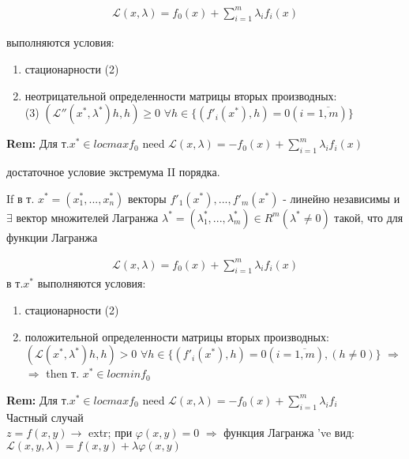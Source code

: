 \begin{equation*}
\begin{aligned}
\mathcal{L}(x,\lambda)=f_0(x) + \sum_{i=1}^{m}\lambda_i f_i(x)
\end{aligned}
\end{equation*}

выполняются условия:
\begin{enumerate}
\item стационарности (2)
\item неотрицательной определенности матрицы вторых производных: \\ 
(3) $(\mathcal{L}''(x^*,\lambda^*)h,h) \geq 0$ $\forall h \in \{ (f'_i(x^*),h) = 0 (i = \overline{1,m})\}$
\end{enumerate}
\textbf{Rem:} Для т.$x^* \in locmax f_0$ need $\mathcal{L}(x,\lambda)=-f_0(x) + \sum _{i=1}^{m} \lambda_i f_i(x)$ \\



\begin{theorem}
достаточное условие экстремума II порядка.
\end{theorem}
\noindent
If в т. $x^* = (x_1^*,...,x_n^*)$ векторы $f'_1(x^*),...,f'_m(x^*)$ - линейно независимы и $\exists$ вектор множителей Лагранжа $\lambda^* = (\lambda_1^*,...,\lambda_m^*) \in R^m (\lambda^* \neq 0)$ такой, что для функции Лагранжа 

\begin{equation*}
\begin{aligned}
\mathcal{L}(x,\lambda)=f_0(x) + \sum_{i=1}^{m}\lambda_i f_i(x)
\end{aligned}
\end{equation*}
 в т.$x^*$ выполняются условия:

\begin{enumerate}
\item стационарности (2)
\item положительной определенности матрицы вторых производных: \\
$(\mathcal{L}(x^*,\lambda^*)h,h)>0$ $\forall h \in \{(f'_i(x^*),h)=0 (i=\overline{1,m}),(h \neq 0)\}$ $\Rightarrow$ \\ $\Rightarrow$ then т. $x^* \in locmin f_0$ 
\end{enumerate}
\textbf{Rem:} Для т.$x^* \in locmax f_0$ need $ \mathcal{L}(x,\lambda) = -f_0(x) + \sum_{i=1}^{m}\lambda_i f_i$ \\ 

Частный случай \\
$z= f(x,y) \rightarrow$ extr; при $\varphi(x,y) = 0$ $\Rightarrow$ функция Лагранжа 've вид: \\
$\mathcal{L}(x,y,\lambda) = f(x,y) + \lambda \varphi(x,y)$ \\

